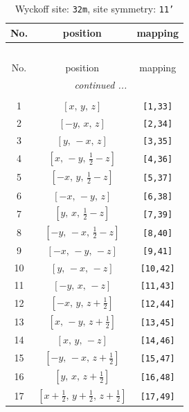 \documentclass[fleqn,8pt]{jsarticle}
\begin{document}
\renewcommand{\arraystretch}{1.2}
\begin{longtable}{ccc}
\caption{Wyckoff site: {\tt 32m}, site symmetry: {\tt 11'}}
 \\
 \hline \hline
No. & position & mapping \\ \hline \endfirsthead

\multicolumn{2}{l}{\tablename\ \thetable{}} \\
 \hline \hline
No. & position & mapping \\ \hline \endhead

 \hline \hline
\multicolumn{2}{r}{\footnotesize\it continued ...} \\ \endfoot

 \hline \hline
\multicolumn{2}{r}{} \\ \endlastfoot

1 & $\left[ x,\, y,\, z \right]$ & {\tt [1,33]} \\ \hline
2 & $\left[ - y,\, x,\, z \right]$ & {\tt [2,34]} \\ \hline
3 & $\left[ y,\, - x,\, z \right]$ & {\tt [3,35]} \\ \hline
4 & $\left[ x,\, - y,\, \frac{1}{2} - z \right]$ & {\tt [4,36]} \\ \hline
5 & $\left[ - x,\, y,\, \frac{1}{2} - z \right]$ & {\tt [5,37]} \\ \hline
6 & $\left[ - x,\, - y,\, z \right]$ & {\tt [6,38]} \\ \hline
7 & $\left[ y,\, x,\, \frac{1}{2} - z \right]$ & {\tt [7,39]} \\ \hline
8 & $\left[ - y,\, - x,\, \frac{1}{2} - z \right]$ & {\tt [8,40]} \\ \hline
9 & $\left[ - x,\, - y,\, - z \right]$ & {\tt [9,41]} \\ \hline
10 & $\left[ y,\, - x,\, - z \right]$ & {\tt [10,42]} \\ \hline
11 & $\left[ - y,\, x,\, - z \right]$ & {\tt [11,43]} \\ \hline
12 & $\left[ - x,\, y,\, z + \frac{1}{2} \right]$ & {\tt [12,44]} \\ \hline
13 & $\left[ x,\, - y,\, z + \frac{1}{2} \right]$ & {\tt [13,45]} \\ \hline
14 & $\left[ x,\, y,\, - z \right]$ & {\tt [14,46]} \\ \hline
15 & $\left[ - y,\, - x,\, z + \frac{1}{2} \right]$ & {\tt [15,47]} \\ \hline
16 & $\left[ y,\, x,\, z + \frac{1}{2} \right]$ & {\tt [16,48]} \\ \hline
17 & $\left[ x + \frac{1}{2},\, y + \frac{1}{2},\, z + \frac{1}{2} \right]$ & {\tt [17,49]} \\ \hline

\end{longtable}
\end{document}
